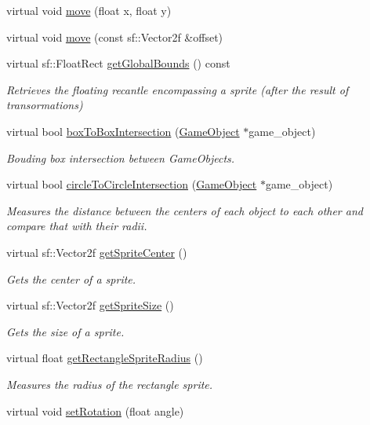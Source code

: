 \begin{DoxyCompactItemize}
\item 
virtual void \hyperlink{class_game_object_a6fa0d948eccbd0345cda6bdea5b5196a}{move} (float x, float y)
\item 
virtual void \hyperlink{class_game_object_a3ad77a6b8bc1adfb8ea463f12c022b1e}{move} (const sf\+::\+Vector2f \&offset)
\item 
virtual sf\+::\+Float\+Rect \hyperlink{class_game_object_a3a1df73c1ffc15d9bb616aebc3e477fd}{get\+Global\+Bounds} () const 
\begin{DoxyCompactList}\small\item\em Retrieves the floating recantle encompassing a sprite (after the result of transormations) \end{DoxyCompactList}\item 
virtual bool \hyperlink{class_game_object_a18a09c750e617f7e3188bda15a7d5fd7}{box\+To\+Box\+Intersection} (\hyperlink{class_game_object}{Game\+Object} $\ast$game\+\_\+object)
\begin{DoxyCompactList}\small\item\em Bouding box intersection between Game\+Objects. \end{DoxyCompactList}\item 
virtual bool \hyperlink{class_game_object_a3a9fd4ee6157fcf61fd8f7d7318598c5}{circle\+To\+Circle\+Intersection} (\hyperlink{class_game_object}{Game\+Object} $\ast$game\+\_\+object)
\begin{DoxyCompactList}\small\item\em Measures the distance between the centers of each object to each other and compare that with their radii. \end{DoxyCompactList}\item 
virtual sf\+::\+Vector2f \hyperlink{class_game_object_afe3b2585b3615868c64b62bb1cb40adb}{get\+Sprite\+Center} ()
\begin{DoxyCompactList}\small\item\em Gets the center of a sprite. \end{DoxyCompactList}\item 
virtual sf\+::\+Vector2f \hyperlink{class_game_object_a267f290e80e877be0de3a9706321c049}{get\+Sprite\+Size} ()
\begin{DoxyCompactList}\small\item\em Gets the size of a sprite. \end{DoxyCompactList}\item 
virtual float \hyperlink{class_game_object_a8220201988f2aaea8a6f748872e188a9}{get\+Rectangle\+Sprite\+Radius} ()
\begin{DoxyCompactList}\small\item\em Measures the radius of the rectangle sprite. \end{DoxyCompactList}\item 
virtual void \hyperlink{class_game_object_a320a94559557834d53bffa538d8349c9}{set\+Rotation} (float angle)
\end{DoxyCompactItemize}
